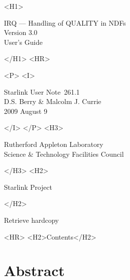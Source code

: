 \documentclass[twoside,11pt]{article}
\newcommand{\stardoccategory}  {Starlink User Note}
\newcommand{\stardocsource}    {sun\stardocnumber}
\newcommand{\stardocnumber}    {261.1}
\newcommand{\stardocauthors}   {D.S. Berry \& Malcolm J. Currie}
\newcommand{\stardocdate}      {2009 August 9}
\newcommand{\stardoctitle}     {IRQ --- Handling of QUALITY in NDFs}
\newcommand{\stardocversion}   {Version 3.0}
\newcommand{\stardocmanual}    {User's Guide}
\newcommand{\htmladdnormallink}[2]{#1}
\newcommand{\htmladdimg}[1]{}
\newcommand{\htmlref}[2]{#1}
\newcommand{\htmladdtonavigation}[1]{}
\newcommand{\xlabel}[1]{}
\renewcommand{\_}{\texttt{\symbol{95}}}
\begin{document}
\begin{htmlonly}
   \xlabel{}
   \begin{rawhtml} <H1> \end{rawhtml}
      \stardoctitle\\
      \stardocversion\\
      \stardocmanual
   \begin{rawhtml} </H1> <HR> \end{rawhtml}


   \begin{rawhtml} <P> <I> \end{rawhtml}
   \stardoccategory\ \stardocnumber \\
   \stardocauthors \\
   \stardocdate
   \begin{rawhtml} </I> </P> <H3> \end{rawhtml}
      \htmladdnormallink{Rutherford Appleton Laboratory}
                        {http://www.scitech.ac.uk} \\
      \htmladdnormallink{Science \& Technology Facilities Council}
                        {http://www.scitech.ac.uk} \\
   \begin{rawhtml} </H3> <H2> \end{rawhtml}
      \htmladdnormallink{Starlink Project}{http://www.starlink.ac.uk/}
   \begin{rawhtml} </H2> \end{rawhtml}
   \htmladdnormallink{\htmladdimg{source.gif} Retrieve hardcopy}
      {http://www.starlink.ac.uk/cgi-bin/hcserver?\stardocsource}\\

  \label{stardoccontents}
  \begin{rawhtml} 
    <HR>
    <H2>Contents</H2>
  \end{rawhtml}
  \htmladdtonavigation{\htmlref{\htmladdimg{contents_motif.gif}}
        {stardoccontents}}

  \section{\xlabel{abstract}Abstract}
\end{htmlonly}
\end{document}
